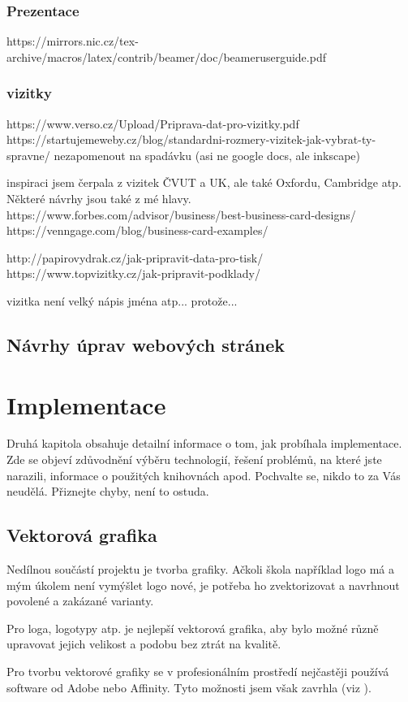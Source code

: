 \documentclass[11pt,a4paper,twoside,openright]{report}
\begin{document}
\subsection{Prezentace}
https://mirrors.nic.cz/tex-archive/macros/latex/contrib/beamer/doc/beameruserguide.pdf
\subsection{vizitky}
https://www.verso.cz/Upload/Priprava-dat-pro-vizitky.pdf
https://startujemeweby.cz/blog/standardni-rozmery-vizitek-jak-vybrat-ty-spravne/
nezapomenout na spadávku (asi ne google docs, ale inkscape)

inspiraci jsem čerpala z vizitek ČVUT a UK, ale také Oxfordu, Cambridge atp. Některé návrhy jsou také z mé hlavy.
https://www.forbes.com/advisor/business/best-business-card-designs/
https://venngage.com/blog/business-card-examples/

http://papirovydrak.cz/jak-pripravit-data-pro-tisk/
https://www.topvizitky.cz/jak-pripravit-podklady/

vizitka není velký nápis jména atp... protože...
\section{Návrhy úprav webových stránek}



\chapter{Implementace}

Druhá kapitola obsahuje detailní informace o tom, jak probíhala implementace. Zde se objeví zdůvodnění výběru technologií, řešení problémů, na které jste narazili, informace o použitých knihovnách apod. Pochvalte se, nikdo to za Vás neudělá. Přiznejte chyby, není to ostuda.

\section{Vektorová grafika}
\label{sec:grafika}
Nedílnou součástí projektu je tvorba grafiky. Ačkoli škola například logo má a mým úkolem není vymýšlet logo nové, je potřeba ho zvektorizovat a navrhnout povolené a zakázané varianty. 

Pro loga, logotypy atp. je nejlepší vektorová grafika, aby bylo možné různě upravovat jejich velikost a podobu bez ztrát na kvalitě.

Pro tvorbu vektorové grafiky se v profesionálním prostředí nejčastěji používá software od Adobe nebo Affinity. Tyto možnosti jsem však zavrhla (viz ).
\end{document}
